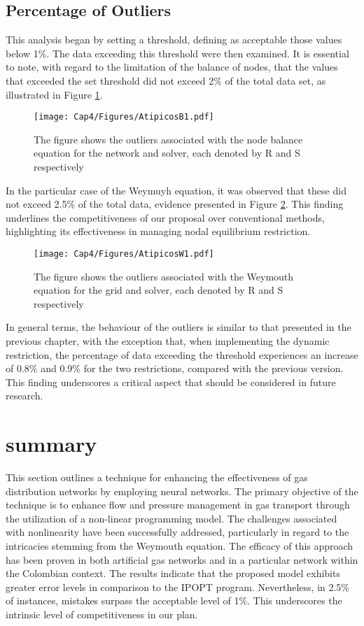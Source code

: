 \newpage


\subsection{Percentage of Outliers}
This analysis began by setting a threshold, defining as acceptable those values below 1$\%$. The data exceeding this threshold were then examined. It is essential to note, with regard to the limitation of the balance of nodes, that the values that exceeded the set threshold did not exceed 2$\%$ of the total data set, as illustrated in Figure \ref{fig:ReB2}.
\begin{figure}[H]
    \centering
    \texttt{[image: Cap4/Figures/AtipicosB1.pdf]}
    \caption{The figure shows the outliers associated with the node balance equation for the network and solver, each denoted by R and S respectively}
    \label{fig:ReB2}
\end{figure}

In the particular case of the Weymuyh equation, it was observed that these did not exceed 2.5$\%$ of the total data, evidence presented in Figure \ref{fig:ReW2}. This finding underlines the competitiveness of our proposal over conventional methods, highlighting its effectiveness in managing nodal equilibrium restriction.

 
\begin{figure}[H]
    \centering
    \texttt{[image: Cap4/Figures/AtipicosW1.pdf]}
    \caption{The figure shows the outliers associated with the Weymouth equation for the grid and solver, each denoted by R and S respectively}
    \label{fig:ReW2}
\end{figure}
In general terms, the behaviour of the outliers is similar to that presented in the previous chapter, with the exception that, when implementing the dynamic restriction, the percentage of data exceeding the threshold experiences an increase of 0.8$\%$ and 0.9$\%$ for the two restrictions, compared with the previous version. This finding underscores a critical aspect that should be considered in future research.


\section{summary}

This section outlines a technique for enhancing the effectiveness of gas distribution networks by employing neural networks. The primary objective of the technique is to enhance flow and pressure management in gas transport through the utilization of a non-linear programming model. The challenges associated with nonlinearity have been successfully addressed, particularly in regard to the intricacies stemming from the Weymouth equation. The efficacy of this approach has been proven in both artificial gas networks and in a particular network within the Colombian context. The results indicate that the proposed model exhibits greater error levels in comparison to the IPOPT program. Nevertheless, in 2.5\% of instances, mistakes surpass the acceptable level of 1\%. This underscores the intrinsic level of competitiveness in our plan.

